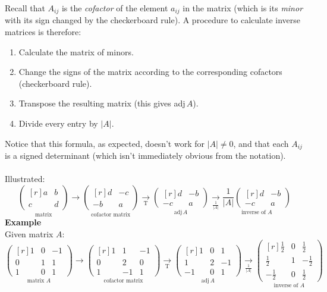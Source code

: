 \documentclass{report}
\begin{document}
Recall that $A_{ij}$ is the \textit{cofactor} of the element $a_{ij}$ in the matrix 
(which is its \textit{minor} with its sign changed by the checkerboard rule). A 
procedure to calculate inverse matrices is therefore:
\begin{enumerate}
\item Calculate the matrix of minors.
\item Change the signs of the matrix according to the corresponding cofactors (checkerboard rule).
\item Transpose the resulting matrix (this gives adj$\,A$).
\item Divide every entry by $|A|$.
\end{enumerate}
Notice that this formula, as expected, doesn't work for $|A|\neq0$, and that each 
$A_{ij}$ is a signed determinant (which isn't immediately obvious from the notation).\\
\vspace{1mm}\\
Illustrated:
\begin{equation*}
\underset{\text{matrix}}{
\begin{pmatrix*}[r]
a&b\\
c&d
\end{pmatrix*}}
\rightarrow
\underset{\text{cofactor matrix}}{
\begin{pmatrix*}[r]
d&-c\\
-b&a
\end{pmatrix*}}
\underset{\text{T}}{\rightarrow}
\underset{\text{adj}\,A}{
\begin{pmatrix*}[r]
d&-b\\
-c&a
\end{pmatrix*}}
\underset{\frac{1}{|A|}}{\rightarrow}
\underset{\text{inverse of }A}{\frac{1}{|A|}
\begin{pmatrix*}[r]
d&-b\\
-c&a
\end{pmatrix*}}
\end{equation*}
\textbf{Example}\\
Given matrix $A$:
\begin{equation*}
\underset{\text{matrix }A}{
\begin{pmatrix*}[r]
1&0&-1\\
0&1&1\\
1&0&1
\end{pmatrix*}}
\rightarrow
\underset{\text{cofactor matrix}}{
\begin{pmatrix*}[r]
1&1&-1\\
0&2&0\\
1&-1&1
\end{pmatrix*}}
\underset{\text{T}}{\rightarrow}
\underset{\text{adj}\,A}{
\begin{pmatrix*}[r]
1&0&1\\
1&2&-1\\
-1&0&1
\end{pmatrix*}}
\underset{\frac{1}{|A|}}{\rightarrow}
\underset{\text{inverse of }A}{
\begin{pmatrix*}[r]
\frac{1}{2}&0&\frac{1}{2}\\
\frac{1}{2}&1&-\frac{1}{2}\\
-\frac{1}{2}&0&\frac{1}{2}
\end{pmatrix*}}
\end{equation*}
\end{document}
